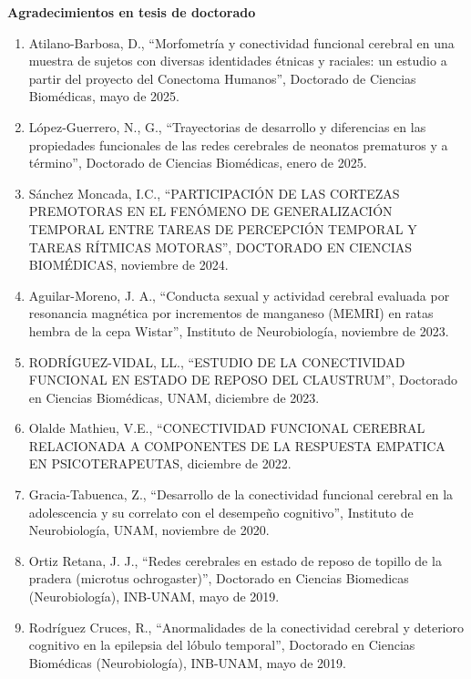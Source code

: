 \textbf{Agradecimientos en tesis de doctorado}

\begin{enumerate}

\item Atilano-Barbosa, D., “Morfometría y conectividad funcional cerebral en una muestra de sujetos con diversas identidades étnicas 
y raciales: un 
estudio a partir del proyecto del Conectoma Humanos”, Doctorado de Ciencias Biomédicas, mayo de 2025.

\item López-Guerrero, N., G., “Trayectorias de desarrollo y diferencias en las propiedades funcionales de las redes cerebrales de neonatos 
prematuros y a término”, Doctorado de Ciencias Biomédicas, enero de 2025.

\item Sánchez Moncada, I.C., “PARTICIPACIÓN DE LAS CORTEZAS PREMOTORAS EN EL FENÓMENO DE GENERALIZACIÓN TEMPORAL ENTRE TAREAS DE PERCEPCIÓN 
TEMPORAL Y TAREAS RÍTMICAS MOTORAS”, DOCTORADO EN CIENCIAS BIOMÉDICAS, noviembre de 2024.

\item Aguilar-Moreno, J. A., “Conducta sexual y actividad cerebral evaluada por resonancia magnética por incrementos de manganeso (MEMRI) en 
ratas 
hembra de la cepa Wistar”, Instituto de Neurobiología, noviembre de 2023.

\item RODRÍGUEZ-VIDAL, LL., “ESTUDIO DE LA CONECTIVIDAD FUNCIONAL EN ESTADO DE REPOSO DEL CLAUSTRUM”, Doctorado en Ciencias Biomédicas, UNAM, 
diciembre de 2023.

\item Olalde Mathieu, V.E., “CONECTIVIDAD FUNCIONAL CEREBRAL RELACIONADA A COMPONENTES DE LA RESPUESTA EMPATICA EN PSICOTERAPEUTAS, diciembre 
de 
2022.

\item Gracia-Tabuenca, Z., “Desarrollo de la conectividad funcional cerebral en la adolescencia y su correlato con el desempeño cognitivo”, 
Instituto de Neurobiología, UNAM, noviembre de 2020.

\item Ortiz Retana, J. J., “Redes cerebrales en estado de reposo de topillo de la pradera (microtus ochrogaster)”, Doctorado en Ciencias 
Biomedicas 
(Neurobiología), INB-UNAM, mayo de 2019.

\item Rodríguez Cruces, R., “Anormalidades de la conectividad cerebral y deterioro cognitivo en la epilepsia del lóbulo temporal”, Doctorado 
en 
Ciencias Biomédicas (Neurobiología), INB-UNAM, mayo de 2019.


\end{enumerate}
